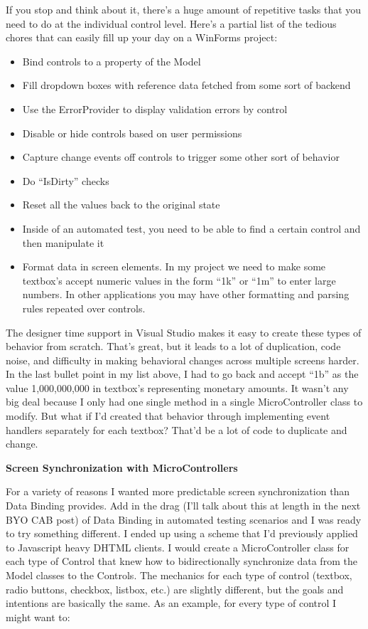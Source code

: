 \documentclass{article}
\begin{document}
{If you stop and think about it, there's a huge amount of repetitive tasks that you need to do at the individual control level.  Here's a partial list of the tedious chores that can easily fill up your day on a WinForms project: 

 \begin{itemize}
  \item  Bind controls to a property of the Model  
 \item  Fill dropdown boxes with reference data fetched from some sort of backend  
 \item  Use the ErrorProvider to display validation errors by control  
 \item  Disable or hide controls based on user permissions  
 \item  Capture change events off controls to trigger some other sort of behavior  
 \item  Do “IsDirty” checks  
 \item  Reset all the values back to the original state  
 \item  Inside of an automated test, you need to be able to find a certain control and then manipulate it  
 \item  Format data in screen elements.  In my project we need to make some textbox's accept numeric values in the form “1k” or “1m” to enter large numbers.  In other applications you may have other formatting and parsing rules repeated over controls.  
 \end{itemize}

The designer time support in Visual Studio makes it easy to create these types of behavior from scratch.  That's great, but it leads to a lot of duplication, code noise, and difficulty in making behavioral changes across multiple screens harder.  In the last bullet point in my list above, I had to go back and accept “1b” as the value 1,000,000,000 in textbox's representing monetary amounts.  It wasn't any big deal because I only had one single method in a single MicroController class to modify.  But what if I'd created that behavior through implementing event handlers separately for each textbox?  That'd be a lot of code to duplicate and change.

\Large {\textbf{Screen Synchronization with MicroControllers}}

For a variety of reasons I wanted more predictable screen synchronization than Data Binding provides.  Add in the drag (I'll talk about this at length in the next BYO CAB post) of Data Binding in automated testing scenarios and I was ready to try something different.  I ended up using a scheme that I'd previously applied to Javascript heavy DHTML clients.  I would create a MicroController class for each type of Control that knew how to bidirectionally synchronize data from the Model classes to the Controls.  The mechanics for each type of control (textbox, radio buttons, checkbox, listbox, etc.) are slightly different, but the goals and intentions are basically the same.  As an example, for every type of control I might want to:

}
\end{document}
